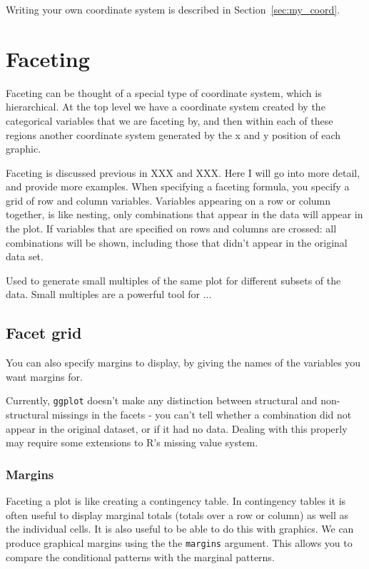 Writing your own coordinate system is described in Section~\ref{sec:my_coord}.


\section{Faceting}
\label{sec:faceting}

Faceting can be thought of a special type of coordinate system, which is hierarchical.  At the top level we have a coordinate system created by the categorical variables that we are faceting by, and then within each of these regions another coordinate system generated by the x and y position of each graphic.

Faceting is discussed previous in XXX and XXX.  Here I will go into more detail, and provide more examples.  When specifying a faceting formula, you specify a grid of row and column variables.  Variables appearing on a row or column together, is like nesting, only combinations that appear in the data will appear in the plot.  If variables that are specified on rows and columns are crossed: all combinations will be shown, including those that didn't appear in the original data set.

Used to generate small multiples of the same plot for different subsets of the data.  Small multiples are a powerful tool for ...  

\subsection{Facet grid}

You can also specify margins to display, by giving the names of the variables you want margins for.  


Currently, {\tt ggplot} doesn't make any distinction between structural and non-structural missings in the facets - you can't tell whether a combination did not appear in the original dataset, or if it had no data.  Dealing with this properly may require some extensions to R's missing value system.  


\subsubsection{Margins}\label{sub:margins}

Faceting a plot is like creating a contingency table.  In contingency tables it is often useful to display marginal totals (totals over a row or column) as well as the individual cells.  It is also useful to be able to do this with graphics.  We can produce graphical margins using the the {\tt margins} argument.  This allows you to compare the conditional patterns with the marginal patterns.

